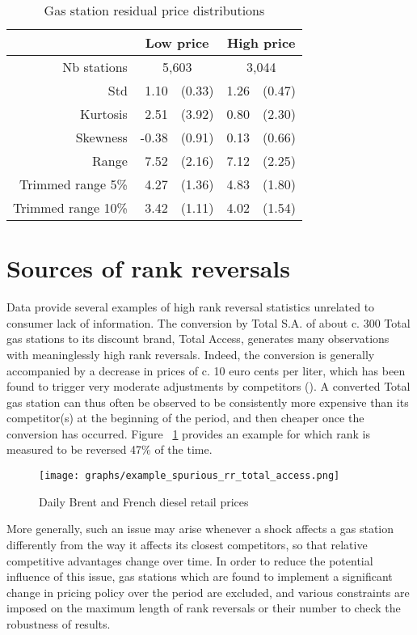\documentclass[english]{article}
\begin{document}
\begin{table}[H]
  \caption{Gas station residual price distributions}
	\label{tab:station_price_support_stats_des}
\begin{tabular}{rrrrr}
\hline
\hline
      & \multicolumn{2}{c}{Low price} & \multicolumn{2}{c}{High price} \\
\hline
Nb stations & \multicolumn{2}{c}{5,603} & \multicolumn{2}{c}{3,044} \\
Std   & 1.10  & (0.33) & 1.26  & (0.47) \\
Kurtosis & 2.51  & (3.92) & 0.80  & (2.30) \\
Skewness & -0.38 & (0.91) & 0.13  & (0.66) \\
Range & 7.52  & (2.16) & 7.12  & (2.25) \\
Trimmed range 5\% & 4.27  & (1.36) & 4.83  & (1.80) \\
Trimmed range 10\% & 3.42  & (1.11) & 4.02  & (1.54) \\
\hline
\hline
\end{tabular}
\end{table}

\section{Sources of rank reversals}

Data provide several examples of high rank reversal statistics unrelated to consumer lack of information. The conversion by Total S.A. of about c. 300 Total gas stations to its discount brand, Total Access, generates many observations with meaninglessly high rank reversals. Indeed, the conversion is generally accompanied by a decrease in prices of c. 10 euro cents per liter, which has been found to trigger very moderate adjustments by competitors (\cite{CHA16}). A converted Total gas station can thus often be observed to be consistently more expensive than its competitor(s) at the beginning of the period, and then cheaper once the conversion has occurred. Figure ~\ref{fig:rr_total_access} provides an example for which rank is measured to be reversed 47\% of the time.

\begin{figure}[H]
    \caption{Daily Brent and French diesel retail prices}
	\centering
		\texttt{[image: graphs/example\_spurious\_rr\_total\_access.png]}
\label{fig:rr_total_access}
\end{figure}

More generally, such an issue may arise whenever a shock affects a gas station differently from the way it affects its closest competitors, so that relative competitive advantages change over time. In order to reduce the potential influence of this issue, gas stations which are found to implement a significant change in pricing policy over the period are excluded, and various constraints are imposed on the maximum length of rank reversals or their number to check the robustness of results.
\end{document}
